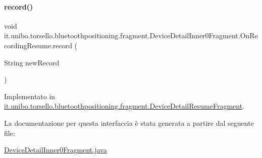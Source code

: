 \paragraph{\texorpdfstring{record()}{record()}}
{\footnotesize\ttfamily void it.\+unibo.\+torsello.\+bluetoothpositioning.\+fragment.\+Device\+Detail\+Inner0\+Fragment.\+On\+Recording\+Resume.\+record (\begin{DoxyParamCaption}\item[{String}]{new\+Record }\end{DoxyParamCaption})}



Implementato in \hyperlink{classit_1_1unibo_1_1torsello_1_1bluetoothpositioning_1_1fragment_1_1DeviceDetailResumeFragment_aa4b3952d75b693caa46309f0f2ca05b4_aa4b3952d75b693caa46309f0f2ca05b4}{it.\+unibo.\+torsello.\+bluetoothpositioning.\+fragment.\+Device\+Detail\+Resume\+Fragment}.



La documentazione per questa interfaccia è stata generata a partire dal seguente file\+:\begin{DoxyCompactItemize}
\item 
\hyperlink{DeviceDetailInner0Fragment_8java}{Device\+Detail\+Inner0\+Fragment.\+java}\end{DoxyCompactItemize}
